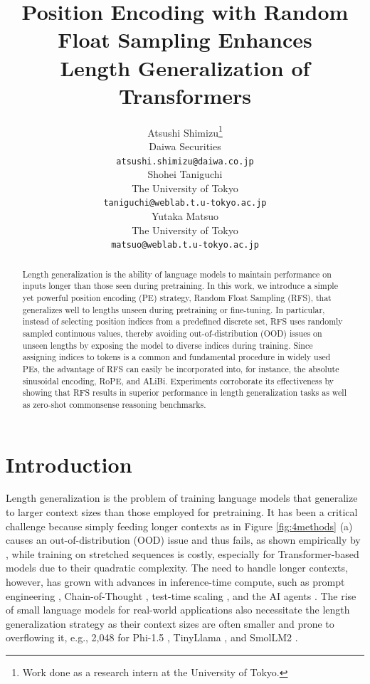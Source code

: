 \documentclass[11pt]{article}
\title{Position Encoding with Random Float Sampling Enhances\\Length Generalization of Transformers}
\author{Atsushi Shimizu\thanks{Work done as a research intern at the University of Tokyo.} \\
  Daiwa Securities \\
  \texttt{atsushi.shimizu@daiwa.co.jp} \\\And
  Shohei Taniguchi \\
  The University of Tokyo \\
  \texttt{taniguchi@weblab.t.u-tokyo.ac.jp} \\\AND
  Yutaka Matsuo \\
  The University of Tokyo \\
  \texttt{matsuo@weblab.t.u-tokyo.ac.jp} \\}
\begin{document}
\maketitle
\begin{abstract}
Length generalization is the ability of language models to maintain performance on inputs longer than those seen during pretraining. In this work, we introduce a simple yet powerful position encoding (PE) strategy, Random Float Sampling (RFS), that generalizes well to lengths unseen during pretraining or fine-tuning. In particular, instead of selecting position indices from a predefined discrete set, RFS uses randomly sampled continuous values, thereby avoiding out-of-distribution (OOD) issues on unseen lengths by exposing the model to diverse indices during training. Since assigning indices to tokens is a common and fundamental procedure in widely used PEs, the advantage of RFS can easily be incorporated into, for instance, the absolute sinusoidal encoding, RoPE, and ALiBi. Experiments corroborate its effectiveness by showing that RFS results in superior performance in length generalization tasks as well as zero-shot commonsense reasoning benchmarks.
\end{abstract}

\section{Introduction}

Length generalization is the problem of training language models that generalize to larger context sizes than those employed for pretraining. It has been a critical challenge because simply feeding longer contexts as in Figure \ref{fig:4methods} (a) causes an out-of-distribution (OOD) issue and thus fails, as shown empirically by \citet{press2021train, kazemnejad2023impact, zhou2024transformers}, while training on stretched sequences is costly, especially for Transformer-based models \cite{vaswani2017attention} due to their quadratic complexity. The need to handle longer contexts, however, has grown with advances in inference-time compute, such as prompt engineering \cite{kojima2022large}, Chain-of-Thought \cite{wei2022chain}, test-time scaling \cite{muennighoff2025s1simpletesttimescaling}, and the AI agents \cite{yao2023react, NEURIPS2023_1b44b878_reflexion}. The rise of small language models for real-world applications \cite{belcak2025small, liquid-ai} also necessitate the length generalization strategy as their context sizes are often smaller and prone to overflowing it, e.g., 2,048 for Phi-1.5 \cite{li2023textbooksneediiphi15}, TinyLlama \cite{zhang2024tinyllamaopensourcesmalllanguage}, and SmolLM2 \cite{allal2025smollm2smolgoesbig}.
\end{document}
